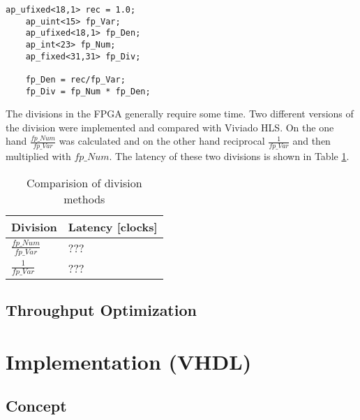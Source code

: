 \begin{minipage}{\textwidth}
\begin{lstlisting}[style=CStyle, caption=Calculation of the division for the Wallis filter, label=lst:division]
	ap_ufixed<18,1> rec = 1.0;
	ap_uint<15> fp_Var;
	ap_ufixed<18,1> fp_Den;
	ap_int<23> fp_Num;
	ap_fixed<31,31> fp_Div;

	fp_Den = rec/fp_Var;
	fp_Div = fp_Num * fp_Den;
\end{lstlisting}
\end{minipage}

The divisions in the FPGA generally require some time. Two different versions of the division were implemented and compared with Viviado HLS. On the one hand $\frac{fp\_Num}{fp\_Var}$ was calculated and on the other hand reciprocal $\frac{1}{fp\_Var}$ and then multiplied with $fp\_Num$. The latency of these two divisions is shown in Table \ref{tab:c_div}. 
\begin{table}[tb!]
    \centering
    \begin{tabular}{l l}
        \toprule
        Division & Latency [clocks]  \\
        \midrule
        $\frac{fp\_Num}{fp\_Var}$ & ??? 
        \\
        $\frac{1}{fp\_Var}$ & ??? 
        \\
        \bottomrule
    \end{tabular}
    \caption{Comparision of division methods}
    \label{tab:c_div}
\end{table}

\subsection{Throughput Optimization}

\section{Implementation (VHDL)} \label{ch:ip:imp_vhdl}

\subsection{Concept}